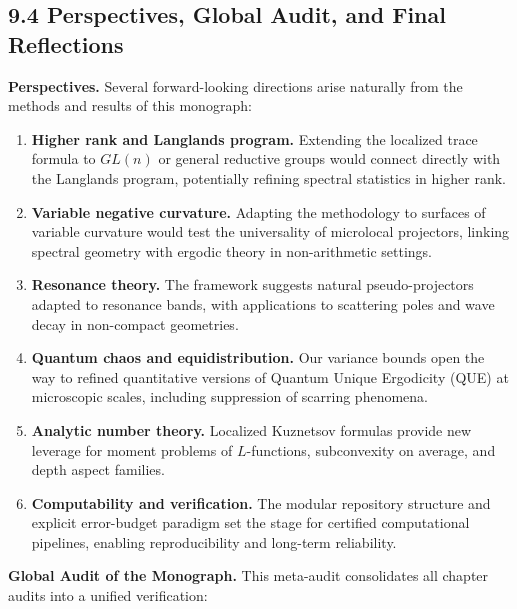 

\subsection{9.4 Perspectives, Global Audit, and Final Reflections}

\noindent\textbf{Perspectives.}
Several forward-looking directions arise naturally from the methods
and results of this monograph:

\begin{enumerate}
  \item \textbf{Higher rank and Langlands program.}  
  Extending the localized trace formula to $GL(n)$ or general reductive groups
  would connect directly with the Langlands program,
  potentially refining spectral statistics in higher rank.

  \item \textbf{Variable negative curvature.}  
  Adapting the methodology to surfaces of variable curvature
  would test the universality of microlocal projectors,
  linking spectral geometry with ergodic theory in non-arithmetic settings.

  \item \textbf{Resonance theory.}  
  The framework suggests natural pseudo-projectors adapted to resonance bands,
  with applications to scattering poles and wave decay in non-compact geometries.

  \item \textbf{Quantum chaos and equidistribution.}  
  Our variance bounds open the way to refined quantitative versions
  of Quantum Unique Ergodicity (QUE) at microscopic scales,
  including suppression of scarring phenomena.

  \item \textbf{Analytic number theory.}  
  Localized Kuznetsov formulas provide new leverage
  for moment problems of $L$-functions,
  subconvexity on average, and depth aspect families.

  \item \textbf{Computability and verification.}  
  The modular repository structure and explicit error-budget paradigm
  set the stage for certified computational pipelines,
  enabling reproducibility and long-term reliability.
\end{enumerate}

\medskip

\noindent\textbf{Global Audit of the Monograph.}
This meta-audit consolidates all chapter audits into a unified verification:

